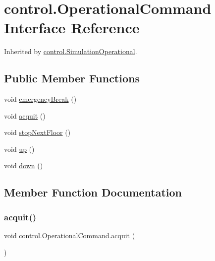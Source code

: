 \hypertarget{interfacecontrol_1_1_operational_command}{}\section{control.\+Operational\+Command Interface Reference}
\label{interfacecontrol_1_1_operational_command}


Inherited by \mbox{\hyperlink{classcontrol_1_1_simulation_operational}{control.\+Simulation\+Operational}}.

\subsection*{Public Member Functions}
\begin{DoxyCompactItemize}
\item 
void \mbox{\hyperlink{interfacecontrol_1_1_operational_command_a63858b26e71770bb4ae232277d54b8a6}{emergency\+Break}} ()
\item 
void \mbox{\hyperlink{interfacecontrol_1_1_operational_command_ab48776483b91f60855a69d7671e02446}{acquit}} ()
\item 
void \mbox{\hyperlink{interfacecontrol_1_1_operational_command_a148c09334384843727fb7b1665252ff1}{stop\+Next\+Floor}} ()
\item 
void \mbox{\hyperlink{interfacecontrol_1_1_operational_command_a23231ea40f8bf5cd07b864238f258b5f}{up}} ()
\item 
void \mbox{\hyperlink{interfacecontrol_1_1_operational_command_a3d1ecf1ec7ad55a3f3e02d2fc9df7e18}{down}} ()
\end{DoxyCompactItemize}


\subsection{Member Function Documentation}
\mbox{\label{interfacecontrol_1_1_operational_command_ab48776483b91f60855a69d7671e02446}} 
\subsubsection{\texorpdfstring{acquit()}{acquit()}}
{\footnotesize\ttfamily void control.\+Operational\+Command.\+acquit (\begin{DoxyParamCaption}{ }\end{DoxyParamCaption})}

